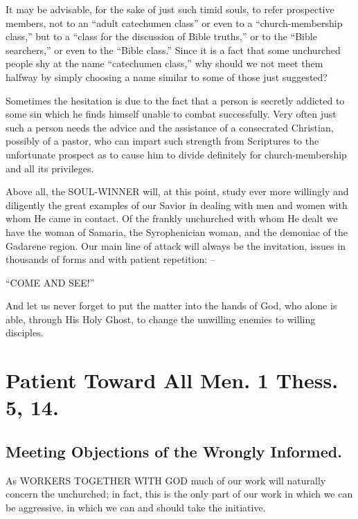 \documentclass[
]{book}
\begin{document}
It may be advisable, for the sake of just such timid souls, to refer prospective members, not to an ``adult catechumen class'' or even to a ``church-membership class,'' but to a ``class for the discussion of Bible truths,'' or to the ``Bible searchers,'' or even to the ``Bible class.'' Since it is a fact that some unchurched people shy at the name ``catechumen class,'' why should we not meet them halfway by simply choosing a name similar to some of those just suggested?

Sometimes the hesitation is due to the fact that a person is secretly addicted to some sin which he finds himself unable to combat successfully. Very often just such a person needs the advice and the assistance of a consecrated Christian, possibly of a pastor, who can impart such strength from Scriptures to the unfortunate prospect as to cause him to divide definitely for church-membership and all its privileges.

Above all, the SOUL-WINNER will, at this point, study ever more willingly and diligently the great examples of our Savior in dealing with men and women with whom He came in contact. Of the frankly unchurched with whom He dealt we have the woman of Samaria, the Syrophenician woman, and the demoniac of the Gadarene region. Our main line of attack will always be the invitation, issues in thousands of forms and with patient repetition: --

``COME AND SEE!''

And let us never forget to put the matter into the hands of God, who alone is able, through His Holy Ghost, to change the unwilling enemies to willing disciples.

\hypertarget{patient-toward-all-men.-1-thess.-5-14.}{%
\chapter{Patient Toward All Men. 1 Thess. 5, 14.}\label{patient-toward-all-men.-1-thess.-5-14.}}

\hypertarget{meeting-objections-of-the-wrongly-informed.}{%
\section*{Meeting Objections of the Wrongly Informed.}\label{meeting-objections-of-the-wrongly-informed.}}

As WORKERS TOGETHER WITH GOD much of our work will naturally concern the unchurched; in fact, this is the only part of our work in which we can be aggressive, in which we can and should take the initiative.
\end{document}
